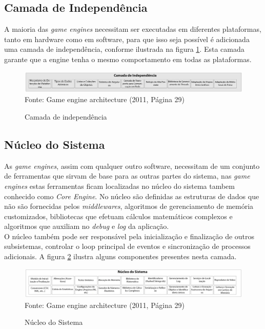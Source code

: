 \documentclass[12pt,	openright, twoside,	a4paper, english, french, spanish, brazil]{abntex2}
\begin{document}
\subsection{Camada de Independência}
A maioria das \textit{game engines} necessitam ser executadas em diferentes plataformas, tanto em hardware como em software, para que isso seja possível é adicionada uma camada de independência, conforme ilustrada na figura \ref{figura:arch_layer}. Esta camada garante que a engine tenha o mesmo comportamento em todas as plataformas.

\begin{figure}[H]
\centering
\caption{Camada de independência}
\includegraphics[width=16cm]{imagens/arch-layer.png}
\\
\small{Fonte: Game engine architecture (2011, Página 29)}
\label{figura:arch_layer}
\end{figure}

\subsection{Núcleo do Sistema}
As \textit{game engines}, assim com qualquer outro software, necessitam de um conjunto de ferramentas que sirvam de base para as outras partes do sistema, nas \textit{game engines} estas ferramentas ficam localizadas no núcleo do sistema tambem conhecido como \textit{Core Engine}. No núcleo são definidas as estruturas de dados que não são fornecidas pelos \textit{middlewares}, algoritmos de gerenciamento de memória customizados, bibliotecas que efetuam cálculos matemáticos complexos e algoritmos que auxiliam no \textit{debug} e \textit{log} da aplicação. \\
O núcleo também pode ser responsável pela inicialização e finalização de outros subsistemas, controlar o loop principal de eventos e sincronização de processos adicionais. A figura \ref{figura:arch_core} ilustra alguns componentes presentes nesta camada.

\begin{figure}[H]
\centering
\caption{Núcleo do Sistema}
\includegraphics[width=16cm]{imagens/arch-core.png}
\\
\small{Fonte: Game engine architecture (2011, Página 29)}
\label{figura:arch_core}
\end{figure}
\end{document}
